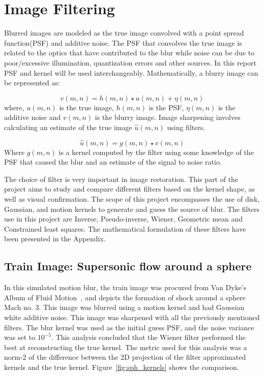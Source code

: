 \graphicspath{{mehul_pics/}}%

\section{Image Filtering}

Blurred images are modeled as the true image convolved with a point spread function(PSF) and additive noise. The PSF that convolves the true image is related to the optics that have contributed to the blur while noise can be due to poor/excessive illumination, quantization errors and other sources. In this report PSF and kernel will be used interchangeably. Mathematically, a blurry image can be represented as:

\begin{equation}
v(m,n)= h(m,n) \star u(m,n) + \eta(m,n)
\end{equation}
where, $u(m,n)$ is the true image, $h(m,n)$ is the PSF, $\eta(m,n)$ is the additive noise and $v(m,n)$ is the blurry image. Image sharpening involves calculating an estimate of the true image $\hat{u}(m,n)$ using filters.

\begin{equation}
\hat{u}(m,n)= g(m,n) \star v(m,n)
\end{equation}
Where $g(m,n)$ is a kernel computed by the filter using some knowledge of the PSF that caused the blur and an estimate of the signal to noise ratio.

The choice of filter is very important in image restoration. This part of the project aims to study and compare different filters based on the kernel shape, as well as visual confirmation. The scope of this project encompasses the use of disk, Gaussian, and motion kernels to generate and guess the source of blur. The filters use in this project are Inverse, Pseudo-inverse, Wiener, Geometric mean and Constrained least squares. The mathematical formulation of these filters have been presented in the Appendix. 
\subsection{Train Image: Supersonic flow around a sphere}
In this simulated motion blur, the train image was procured from Van Dyke's Album of Fluid Motion~\cite{VanDyke:1982}, and depicts the formation of shock around a sphere Mach no. 3. This image was blurred using a motion kernel and had Gaussian white additive noise. This image was sharpened with all the previously mentioned filters. The blur kernel was used as the initial guess PSF, and the noise variance was set to $10^{-5}$. 
This analysis concluded that the Wiener filter performed the best at reconstructing the true kernel. The metric used for this analysis was a norm-2 of the difference between the 2D projection of the filter approximated kernels and the true kernel. Figure~\ref{fig:sph_kernels} shows the comparison.

